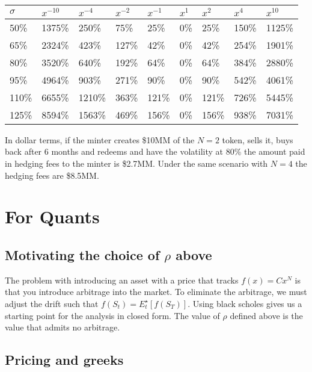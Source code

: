 \documentclass[12pt]{article}
\begin{document}
    \begin{center}
        \begin{tabular}{l||l|l|l|l|l|l|l|l}
            $\sigma$ & $x^{-10}$ & $x^{-4}$ & $x^{-2}$ & $x^{-1}$ & $x^{1}$ & $x^{2}$ & $x^{4}$ & $x^{10}$ \\ \hline \hline
            50\%     & 1375\%    & 250\%    & 75\%     & 25\%     & 0\%     & 25\%    & 150\%   & 1125\%   \\ \hline
            65\%     & 2324\%    & 423\%    & 127\%    & 42\%     & 0\%     & 42\%    & 254\%   & 1901\%   \\ \hline
            80\%     & 3520\%    & 640\%    & 192\%    & 64\%     & 0\%     & 64\%    & 384\%   & 2880\%   \\ \hline
            95\%     & 4964\%    & 903\%    & 271\%    & 90\%     & 0\%     & 90\%    & 542\%   & 4061\%   \\ \hline
            110\%    & 6655\%    & 1210\%   & 363\%    & 121\%    & 0\%     & 121\%   & 726\%   & 5445\%   \\ \hline
            125\%    & 8594\%    & 1563\%   & 469\%    & 156\%    & 0\%     & 156\%   & 938\%   & 7031\%
        \end{tabular}
    \end{center}

    In dollar terms, if the minter creates \$10MM of the $N=2$ token, sells it, buys back after 6 months and redeems and have the volatility at 80\% the amount paid in hedging fees to the minter is \$2.7MM. Under the same scenario with $N=4$ the hedging fees are \$8.5MM.


    \section{For Quants}

    \subsection{Motivating the choice of $\rho$ above}
    The problem with introducing an asset with a price that tracks $f(x) = C x^N$ is that you introduce arbitrage into the market. To eliminate the arbitrage, we must adjust the drift such that $f(S_t) = E_t^\star[ f(S_T) ] $. Using black scholes gives us a starting point for the analysis in closed form. The value of $\rho$ defined above is the value that admits no arbitrage.

    \subsection{Pricing and greeks}
\end{document}
